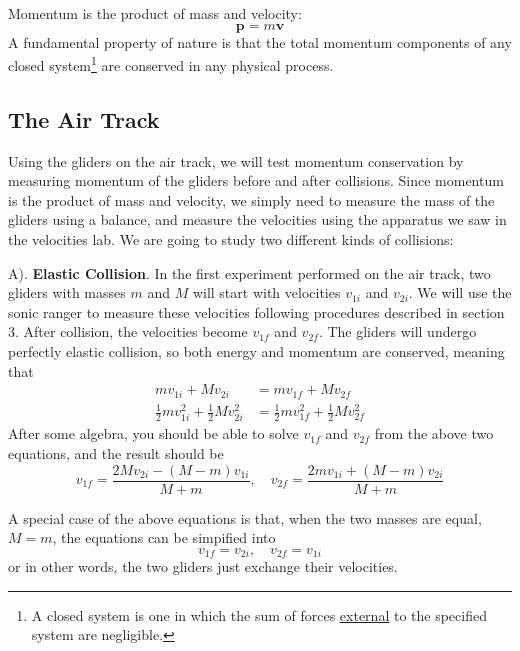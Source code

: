 Momentum is the product of mass and velocity:
\begin{equation}
  \mathbf{p}=m\mathbf{v}
\end{equation}
A fundamental property of nature is that the total momentum components of any closed system\footnote{A closed system is one in which the sum of forces \underline{external} to the specified system are negligible.} are conserved in any physical process.
\subsection{The Air Track}

Using the gliders on the air track, we will test momentum conservation by measuring momentum of the gliders before and after collisions. Since momentum is the product of mass and velocity, we simply need to measure the mass of the gliders using a balance, and measure the velocities using the apparatus we saw in the velocities lab. We are going to study two different kinds of collisions:\myskip

A). \textbf{Elastic Collision}. In the first experiment performed on the air track, two gliders with masses $m$ and $M$ will start with velocities $v_{1i}$ and $v_{2i}$. We will use the sonic ranger to measure these velocities following procedures described in section 3. After collision, the velocities become $v_{1f}$ and $v_{2f}$. The gliders will undergo perfectly elastic collision, so both energy and momentum are conserved, meaning that
\begin{align}
    mv_{1i} + Mv_{2i} &=  mv_{1f} + Mv_{2f} \\
    \frac{1}{2}mv_{1i}^2 + \frac{1}{2}Mv_{2i}^2 &= \frac{1}{2}mv_{1f}^2 + \frac{1}{2}Mv_{2f}^2
\end{align}
After some algebra, you should be able to solve $v_{1f}$ and $v_{2f}$ from the above two equations, and the result should be
\begin{equation}
    v_{1f} = \frac{2Mv_{2i} - (M-m)v_{1i}}{M+m},\quad v_{2f} = \frac{2mv_{1i} + (M-m)v_{2i}}{M+m}
\end{equation}

A special case of the above equations is that, when the two masses are equal, $M=m$, the equations can be simpified into
\begin{equation}
    v_{1f} = v_{2i},\quad v_{2f} = v_{1i}
\end{equation}
or in other words, the two gliders just exchange their velocities.
\myskip

